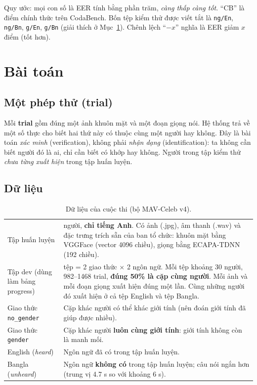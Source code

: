\documentclass[11pt,a4paper,oneside]{report}
\newcommand{\key}[1]{\textbf{\color{accent}#1}}
\newcommand{\id}[1]{\texttt{#1}}
\begin{document}
Quy ước: mọi con số là EER tính bằng phần trăm, \emph{càng thấp càng tốt}. ``CB'' là điểm chính thức trên CodaBench. Bốn tệp kiểm thử được viết tắt là \id{ng/En}, \id{ng/Bn}, \id{g/En}, \id{g/Bn} (giải thích ở Mục~\ref{sec:task}). Chênh lệch ``$-x$'' nghĩa là EER giảm $x$ điểm (tốt hơn).

\section{Bài toán}
\label{sec:task}

\subsection{Một phép thử (trial)}
Mỗi \key{trial} gồm đúng một ảnh khuôn mặt và một đoạn giọng nói. Hệ thống trả về một số thực cho biết hai thứ này có thuộc cùng một người hay không. Đây là bài toán \emph{xác minh} (verification), không phải \emph{nhận dạng} (identification): ta không cần biết người đó là ai, chỉ cần biết có khớp hay không. Người trong tập kiểm thử \emph{chưa từng xuất hiện} trong tập huấn luyện.

\subsection{Dữ liệu}
\begin{table}[h]
\centering\small
\caption{Dữ liệu của cuộc thi (bộ MAV-Celeb v4).}
\label{tab:data}
\begin{tabular}{>{\raggedright}p{3.2cm}>{\raggedright\arraybackslash}p{11.6cm}}
\toprule
Tập huấn luyện & 70 người, \textbf{chỉ tiếng Anh}. Có ảnh (.jpg), âm thanh (.wav) và đặc trưng trích sẵn của ban tổ chức: khuôn mặt bằng VGGFace (vector 4096 chiều), giọng bằng ECAPA-TDNN (192 chiều). \\
Tập dev (dùng làm bảng progress) & 4 tệp = 2 giao thức $\times$ 2 ngôn ngữ. Mỗi tệp khoảng 30 người, 982--1468 trial, \textbf{đúng 50\% là cặp cùng người}. Mỗi ảnh và mỗi đoạn giọng xuất hiện đúng một lần. Cùng những người đó xuất hiện ở cả tệp English và tệp Bangla. \\
Giao thức \id{no\_gender} & Cặp khác người có thể khác giới tính (nên đoán giới tính đã giúp được nhiều). \\
Giao thức \id{gender} & Cặp khác người \textbf{luôn cùng giới tính}: giới tính không còn là manh mối. \\
English (\emph{heard}) & Ngôn ngữ đã có trong tập huấn luyện. \\
Bangla (\emph{unheard}) & Ngôn ngữ \textbf{không có} trong tập huấn luyện; câu nói ngắn hơn (trung vị 4.7 s so với khoảng 6 s). \\
\bottomrule
\end{tabular}
\end{table}
\end{document}
